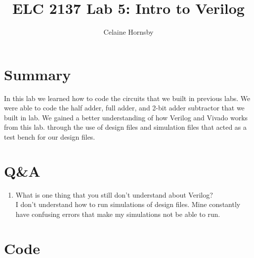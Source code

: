 \documentclass[11pt]{article}
\newcommand{\Verilog}[2][]{%
	
}
\begin{document}
\title{ELC 2137 Lab 5: Intro to Verilog}
\author{Celaine Hornsby}

\maketitle


\section*{Summary}
In this lab we learned how to code the circuits that we built in previous labs. We were able to code the half adder, full adder, and 2-bit adder subtractor that we built in lab. We gained a better understanding of how Verilog and Vivado works from this lab. through the use of design files and simulation files that acted as a test bench for our design files.  


\section*{Q\&A}

\begin{enumerate}
\item What is one thing that you still don't understand about Verilog?\\
	I don't understand how to run simulations of design files. Mine constantly have confusing errors that make my simulations not be able to run. 
\end{enumerate}

\section*{Code}

\Verilog[caption = halfadder.sv]{/Users/Celaine_Hornsby1/Documents/GitHub/Lab05/Lab05/Lab05.srcs/sources_1/new/halfadder.sv}

\Verilog[caption = halfadder test.sv]{/Users/Celaine_Hornsby1/Documents/GitHub/Lab05/Lab05/Lab05.srcs/sim_1/new/halfadder_test.sv}

\Verilog[caption = fulladder.sv]{/Users/Celaine_Hornsby1/Documents/GitHub/Lab05/Lab05/Lab05.srcs/sources_1/new/fulladder.sv}

\Verilog[caption = full adder test.sv]{/Users/Celaine_Hornsby1/Documents/GitHub/Lab05/Lab05/Lab05.srcs/sim_2/new/FA_test.sv}

\Verilog[caption = 2bit]{/Users/Celaine_Hornsby1/Documents/GitHub/Lab05/Lab05/Lab05.srcs/sources_1/new/addsub3.sv}
\end{document}
